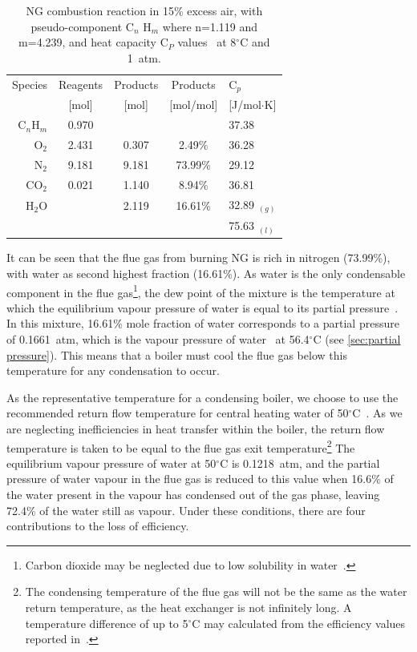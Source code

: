\documentclass[5p]{elsarticle} %
\begin{document}
\begin{small}
\begin{table}[ht]
    \centering
    \caption{NG combustion reaction in 15\% excess air, with pseudo-component C$_{n}$ H$_{m}$ where n=1.119 and m=4.239, and heat capacity C$_P$ values~\citep{Huber2022} at 8$^\circ$C and 1~atm.}
    \label{tab:NTSgcombustion}
    \begin{tabular}{r|ccc|l}
         Species & Reagents & Products & Products & C$_p$ \\
         & {\small[mol]} & {\small[mol]} & {\small[mol/mol]} & {\small[J/mol$\cdot$K]} \\
         \hline
         C$_{n}$H$_{m}$ & 0.970 & & & 37.38 \\
         O$_2$ & 2.431 & 0.307 & 2.49\% & 36.28 \\
         N$_2$ & 9.181 & 9.181 & 73.99\% & 29.12 \\
         CO$_2$ & 0.021 & 1.140 & 8.94\% & 36.81 \\
         H$_2$O & & 2.119 & 16.61\% & 32.89 $_{(g)}$ \\
          & &  &  & 75.63 $_{(l)}$ \\
    \end{tabular}
\end{table}
\end{small}

It can be seen that the flue gas from burning NG is rich in nitrogen (73.99\%), with water as second highest fraction (16.61\%).
As water is the only condensable component in the flue gas\footnote{
Carbon dioxide may be neglected due to low solubility in water~\citep{Zhao2023}.
}, the dew point of the mixture is the temperature at which the equilibrium vapour pressure of water is equal to its partial pressure~\citep{Perry2008}. 
In this mixture, 16.61\% mole fraction of water corresponds to a partial pressure of 0.1661~atm, which is the vapour pressure of water~\citep{Perry2008} at 56.4$^{\circ}$C (see \ref{sec:partial pressure}).
This means that a boiler must cool the flue gas below this temperature for any condensation to occur. 

As the representative temperature for a condensing boiler, we choose to use the recommended return flow temperature for central heating water of 50$^{\circ}$C~\citep{BEIS-Kiwa2021}. 
As we are neglecting inefficiencies in heat transfer within the boiler, the return flow temperature is taken to be equal to the flue gas exit temperature\footnote{
The condensing temperature of the flue gas will not be the same as the water return temperature, as the heat exchanger is not infinitely long. A temperature difference of up to 5$^{\circ}$C may calculated from the efficiency values reported in~\citep{saty2018,DESNZ2023b}.}
The equilibrium vapour pressure of water at 50$^{\circ}$C is 0.1218~atm, and the partial pressure of water vapour in the flue gas is reduced to this value when 16.6\% of the water present in the vapour has condensed out of the gas phase, leaving 72.4\% of the water still as vapour.
Under these conditions, there are four contributions to the loss of efficiency.
\end{document}
